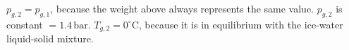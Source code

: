 \( p_{g,2} = p_{g,1} \), because the weight above always represents the same value.  
\( p_{g,2} \) is constant \( = 1.4 \, \text{bar} \).  
\( T_{g,2} = 0^\circ \text{C} \), because it is in equilibrium with the ice-water liquid-solid mixture.